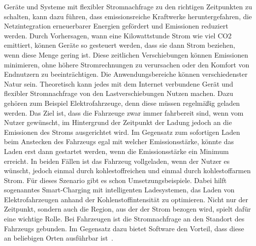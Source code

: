 Geräte und Systeme mit flexibler Stromnachfrage zu den richtigen Zeitpunkten zu schalten, kann dazu führen, dass emissionsreiche Kraftwerke heruntergefahren, die Netzintegration erneuerbarer Energien gefördert und Emissionen reduziert werden.
Durch Vorhersagen, wann eine Kilowattstunde Strom wie viel CO2 emittiert, können Geräte so gesteuert werden, dass sie dann Strom beziehen, wenn diese Menge gering ist.
Diese zeitlichen Verschiebungen können Emissionen minimieren, ohne höhere Stromrechnungen zu verursachen oder den Komfort von Endnutzern zu beeinträchtigen.
Die Anwendungsbereiche können verschiedenster Natur sein.
Theoretisch kann jedes mit dem Internet verbundene Gerät und flexibler Stromnachfrage von den Lastverschiebungen Nutzen machen.
Dazu gehören zum Beispiel Elektrofahrzeuge, denn diese müssen regelmäßig geladen werden.
Das Ziel ist, dass die Fahrzeuge zwar immer fahrbereit sind, wenn vom Nutzer gewünscht, im Hintergrund der Zeitpunkt der Ladung jedoch an die Emissionen des Stroms ausgerichtet wird.
Im Gegensatz zum sofortigen Laden beim Anstecken des Fahrzeugs egal mit welcher Emissionsstärke, könnte das Laden erst dann gestartet werden, wenn die Emissionsstärke ein Minimum erreicht.
In beiden Fällen ist das Fahrzeug vollgeladen, wenn der Nutzer es wünscht, jedoch einmal durch kohlestoffreichen und einmal durch kohlestoffarmen Strom.
Für dieses Szenario gibt es schon Umsetzungsbeispiele.
Dabei hilft sogenanntes \glqq Smart-Charging\grqq{} mit intelligenten Ladesystemen, das Laden von Elektrofahrzeugen anhand der Kohlenstoffintensität zu optimieren.
Nicht nur der Zeitpunkt, sondern auch die Region, aus der der Strom bezogen wird, spielt dafür eine wichtige Rolle.
Bei Fahrzeugen ist die Stromnachfrage an den Standort des Fahrzeugs gebunden.
Im Gegensatz dazu bietet Software den Vorteil, dass diese an beliebigen Orten ausführbar ist~\cite{WattTime.12.3.2024}.

